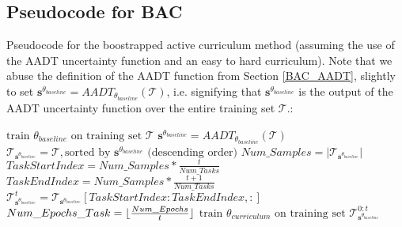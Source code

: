 \subsection{Pseudocode for BAC}\label{BACPseudocode}
Pseudocode for the boostrapped active curriculum method (assuming the use of the AADT uncertainty function and an easy to hard curriculum). Note that we abuse the definition of the AADT function from Section \ref{BAC_AADT}, slightly to set $\mathbf{s}^{\theta_{baseline}} = AADT_{\theta_{baseline}}(\mathcal{T}) $, i.e. signifying that $\mathbf{s}^{\theta_{baseline}} $ is the output of the AADT uncertainty function over the entire training set $\mathcal{T}$.:
\begin{algorithmic}
\STATE $\text{train }  \theta_{baseline} \text{ on training set } \mathcal{T}$
\ENDFOR
\STATE $\mathbf{s}^{\theta_{baseline}} = AADT_{\theta_{baseline}}(\mathcal{T})$
\STATE $\mathcal{T}_{\mathbf{s}^{\theta_{baseline}}} = \mathcal{T}, \text{sorted by } \mathbf{s}^{\theta_{baseline}} \text{ (descending order)}$ 
\STATE $Num\_Samples = |\mathcal{T}_{\mathbf{s}^{\theta_{baseline}}}|$
\STATE $TaskStartIndex = Num\_Samples*\frac{t}{Num\_Tasks} $
\STATE $TaskEndIndex = Num\_Samples*\frac{t+1}{Num\_Tasks} $
\STATE $\mathcal{T}^{t}_{\mathbf{s}^{\theta_{baseline}}} = \mathcal{T}_{\mathbf{s}^{\theta_{baseline}}}[TaskStartIndex:TaskEndIndex,:] $
\ENDFOR
{}
\STATE $Num\_Epochs\_Task = \lfloor\frac{Num\_Epochs}{t}\rfloor$
\STATE $\text{train }  \theta_{curriculum} \text{ on training set } \mathcal{T}^{0:t}_{\mathbf{s}^{\theta_{baseline}}} $
\ENDFOR
\ENDFOR
\end{algorithmic}

